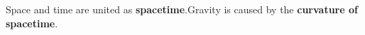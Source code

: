 \documentclass[preview]{standalone}
\begin{document}
\begin{center}
Space and time are united as \textbf{spacetime}.Gravity is caused by the \textbf{curvature of spacetime}.
\end{center}
\end{document}
